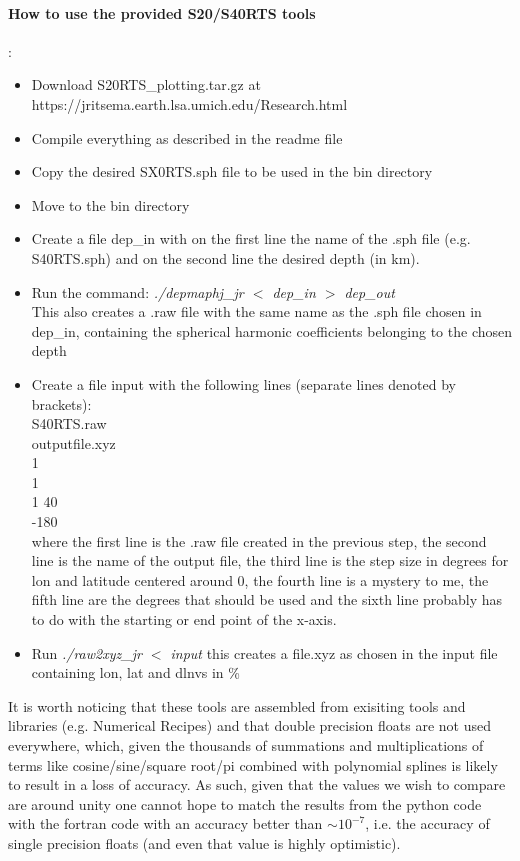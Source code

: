 \paragraph{How to use the provided S20/S40RTS tools}:
\begin{itemize}
\item   Download {\filenamefont S20RTS\_plotting.tar.gz} at https://jritsema.earth.lsa.umich.edu/Research.html
\item   Compile everything as described in the {\filenamefont readme} file
\item   Copy the desired {\filenamefont SX0RTS.sph} file to be used in the bin directory
\item   Move to the bin directory
\item   Create a file {\filenamefont dep\_in} with on the first line the name of the .sph file (e.g. {\filenamefont S40RTS.sph}) 
        and on the second line the desired depth (in km).
\item   Run the command: {\sl ./depmaphj\_jr $<$ dep\_in $>$ dep\_out} \\
        This also creates a .raw file with 
        the same name as the .sph file chosen in {\filenamefont dep\_in}, containing the spherical harmonic coefficients 
        belonging to the chosen depth 
\item   Create a file {\filenamefont input} with the following lines (separate lines denoted by brackets):\\
        S40RTS.raw\\
        outputfile.xyz \\
        1 \\
        1 \\
        1 40\\
        -180\\ 
        where the first line is the .raw file created in the previous step, the second line is 
        the name of the output file, the third line is the step size in degrees for lon and 
        latitude centered around 0, the fourth line is a mystery to me, the fifth line 
        are the degrees that should be used and the sixth line probably has to do with the 
        starting or end point of the x-axis. 
\item   Run {\sl ./raw2xyz\_jr $<$ input} this creates a {\filenamefont file.xyz} as chosen in the input file containing lon, 
        lat and dlnvs in \%
\end{itemize}

It is worth noticing that these tools are assembled from exisiting tools and libraries (e.g. 
Numerical Recipes) and that double precision floats are not used everywhere, which, given the
thousands of summations and multiplications of terms like cosine/sine/square root/pi combined
with polynomial splines is likely 
to result in a loss of accuracy. As such, given that the values we wish to compare are around
unity one cannot hope to match the results from the python code with the fortran code with 
an accuracy better than $\sim 10^{-7}$, i.e. the accuracy of single precision floats  (and even 
that value is highly optimistic).

